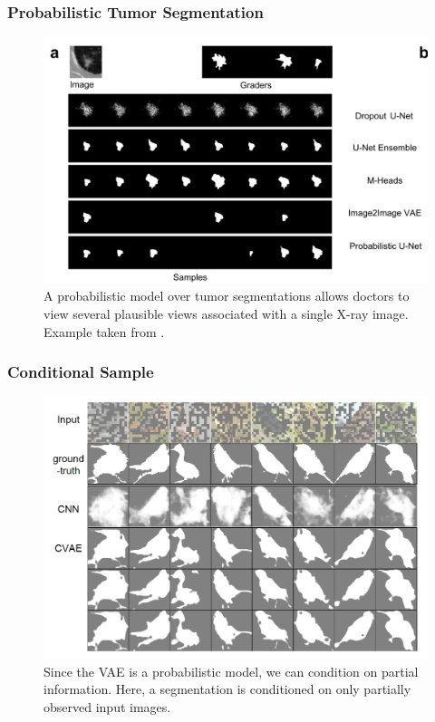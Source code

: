 \documentclass[10pt,mathserif]{beamer}
\begin{document}
\begin{frame}
  \frametitle{Probabilistic Tumor Segmentation}
\begin{figure}[ht]
  \centering
  \includegraphics[width=0.6\paperwidth]{figure/vae_unet}
  \caption{A probabilistic model over tumor segmentations allows doctors to view
    several plausible views associated with a single X-ray
    image. Example taken from
    \citep{kohl2018probabilistic}. \label{fig:vae_unet} }
\end{figure}
\end{frame}

\begin{frame}
  \frametitle{Conditional Sample}
\begin{figure}[ht]
  \centering
  \includegraphics[width=0.6\paperwidth]{figure/vae_conditional}
  \caption{Since the VAE is a probabilistic model, we can condition on partial
    information. Here, a segmentation is conditioned on only partially observed
    input images. \label{fig:vae_conditional} }
\end{figure}
\end{frame}
\end{document}
